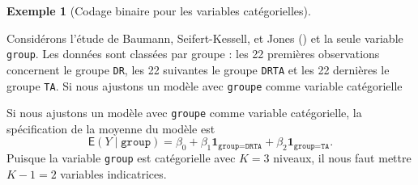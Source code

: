 \documentclass[
  11pt,
  letterpaper,
]{scrbook}
\newenvironment{Shaded}{\begin{snugshade}}{\end{snugshade}}
\newcommand{\AttributeTok}[1]{\textcolor[rgb]{0.40,0.45,0.13}{#1}}
\newcommand{\CommentTok}[1]{\textcolor[rgb]{0.37,0.37,0.37}{#1}}
\newcommand{\DecValTok}[1]{\textcolor[rgb]{0.68,0.00,0.00}{#1}}
\newcommand{\FunctionTok}[1]{\textcolor[rgb]{0.28,0.35,0.67}{#1}}
\newcommand{\NormalTok}[1]{\textcolor[rgb]{0.00,0.23,0.31}{#1}}
\newcommand{\SpecialCharTok}[1]{\textcolor[rgb]{0.37,0.37,0.37}{#1}}
\newcommand{\StringTok}[1]{\textcolor[rgb]{0.13,0.47,0.30}{#1}}
\theoremstyle{plain}
\theoremstyle{plain}
\theoremstyle{definition}
\newtheorem{example}{Exemple}[chapter]
\theoremstyle{definition}
\theoremstyle{remark}
\begin{document}
\begin{example}[Codage binaire pour les variables
catégorielles]\protect\hypertarget{exm-baumann-dummies}{}\label{exm-baumann-dummies}

Considérons l'étude de Baumann, Seifert-Kessell, et Jones
() et la seule variable \texttt{group}.
Les données sont classées par groupe : les 22 premières observations
concernent le groupe \texttt{DR}, les 22 suivantes le groupe
\texttt{DRTA} et les 22 dernières le groupe \texttt{TA}. Si nous
ajustons un modèle avec \texttt{groupe} comme variable catégorielle

\begin{Shaded}
\end{Shaded}

Si nous ajustons un modèle avec \texttt{groupe} comme variable
catégorielle, la spécification de la moyenne du modèle est
\[\mathsf{E}(Y \mid \texttt{group})= \beta_0 + \beta_1\mathbf{1}_{\texttt{group}=\texttt{DRTA}} + \beta_2\mathbf{1}_{\texttt{group}=\texttt{TA}}.\]
Puisque la variable \texttt{group} est catégorielle avec \(K=3\)
niveaux, il nous faut mettre \(K-1 = 2\) variables indicatrices.


\end{example}
\end{document}
